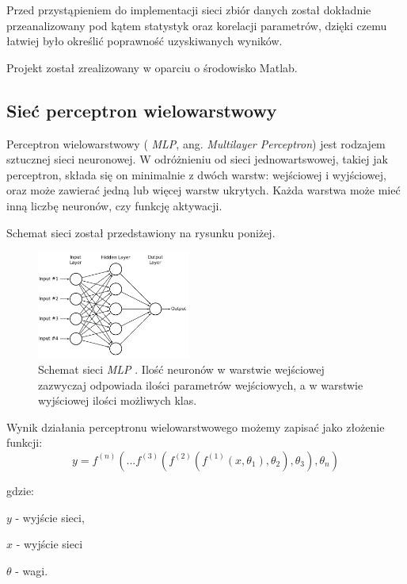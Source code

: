 \documentclass[12pt]{article}
\begin{document}
Przed przystąpieniem do implementacji sieci  zbiór danych został dokładnie przeanalizowany pod kątem statystyk oraz korelacji parametrów, dzięki czemu łatwiej było określić poprawność uzyskiwanych wyników.

Projekt został zrealizowany w oparciu o środowisko Matlab.

\subsection{Sieć perceptron wielowarstwowy}
Perceptron wielowarstwowy ( \textit{MLP}, ang. \textit{Multilayer Perceptron}) jest rodzajem sztucznej sieci neuronowej. W odróżnieniu od sieci jednowartswowej, takiej jak perceptron, składa się on minimalnie z dwóch warstw: wejściowej i wyjściowej, oraz może zawierać jedną lub więcej warstw ukrytych. Każda warstwa może mieć inną liczbę neuronów, czy funkcję aktywacji.

Schemat sieci został przedstawiony na rysunku poniżej.

\begin{figure}[H]
\centering
\includegraphics[width=0.45\textwidth]{mlp-schema.png}
\caption{Schemat sieci \textit{MLP} \cite{mlp-schema}. Ilość neuronów w warstwie wejściowej zazwyczaj odpowiada ilości parametrów wejściowych, a w warstwie wyjściowej ilości możliwych klas.}
\end{figure}


Wynik działania perceptronu wielowarstwowego możemy zapisać jako złożenie funkcji\cite{wiki}:
\begin{equation}
y = f^{(n)}(... f^{(3)}(f^{(2)}(f^{(1)}(x, \theta_1), \theta_2), \theta_3), \theta_n)
\end{equation}

gdzie:
\begin{description}
\item $y$ - wyjście sieci,
\item $x$ - wyjście sieci
\item $\theta$ - wagi.
\end{description}
\end{document}
